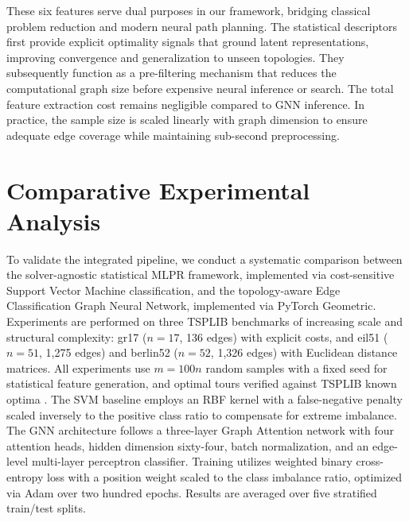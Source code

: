 \documentclass[twoside]{article}
\begin{document}
	

	These six features serve dual purposes in our framework, bridging classical problem reduction and modern neural path planning. The statistical descriptors first provide explicit optimality signals that ground latent representations, improving convergence and generalization to unseen topologies. They subsequently function as a pre-filtering mechanism that reduces the computational graph size before expensive neural inference or search. The total feature extraction cost remains negligible compared to GNN inference. In practice, the sample size is scaled linearly with graph dimension to ensure adequate edge coverage while maintaining sub-second preprocessing. %

		

	\section{Comparative Experimental Analysis}
	To validate the integrated pipeline, we conduct a systematic comparison between the solver-agnostic statistical MLPR framework, implemented via cost-sensitive Support Vector Machine classification, and the topology-aware Edge Classification Graph Neural Network, implemented via PyTorch Geometric. Experiments are performed on three TSPLIB benchmarks of increasing scale and structural complexity: gr17 ($n=17$, 136 edges) with explicit costs, and eil51 ($n=51$, 1,275 edges) and berlin52 ($n=52$, 1,326 edges) with Euclidean distance matrices. All experiments use $m=100n$ random samples with a fixed seed for statistical feature generation, and optimal tours verified against TSPLIB known optima \cite{reinelt1991tsplib}. The SVM baseline employs an RBF kernel with a false-negative penalty scaled inversely to the positive class ratio to compensate for extreme imbalance. The GNN architecture follows a three-layer Graph Attention network with four attention heads, hidden dimension sixty-four, batch normalization, and an edge-level multi-layer perceptron classifier. Training utilizes weighted binary cross-entropy loss with a position weight scaled to the class imbalance ratio, optimized via Adam over two hundred epochs. Results are averaged over five stratified train/test splits.
\end{document}
